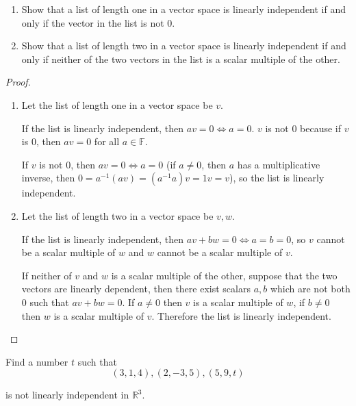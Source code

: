 \begin{exercise}
    \begin{enumerate}[label={(\alph*)}]
        \item Show that a list of length one in a vector space is linearly independent if and only if the vector in the list is not $0$.
        \item Show that a list of length two in a vector space is linearly independent if and only if neither of the two vectors in the list is a scalar multiple of the other.
    \end{enumerate}
\end{exercise}

\begin{proof}
    \begin{enumerate}[label={(\alph*)}]
        \item Let the list of length one in a vector space be $v$.

              If the list is linearly independent, then $av = 0\Longleftrightarrow a = 0$. $v$ is not $0$ because if $v$ is $0$, then $av = 0$ for all $a\in\mathbb{F}$.

              If $v$ is not $0$, then $av = 0\Longleftrightarrow a = 0$ (if $a\ne 0$, then $a$ has a multiplicative inverse, then $0 = a^{-1}(av) = (a^{-1}a)v = 1v = v$), so the list is linearly independent.
        \item Let the list of length two in a vector space be $v, w$.

              If the list is linearly independent, then $av + bw = 0\Longleftrightarrow a = b = 0$, so $v$ cannot be a scalar multiple of $w$ and $w$ cannot be a scalar multiple of $v$.

              If neither of $v$ and $w$ is a scalar multiple of the other, suppose that the two vectors are linearly dependent, then there exist scalars $a, b$ which are not both $0$ such that $av + bw = 0$. If $a\ne 0$ then $v$ is a scalar multiple of $w$, if $b\ne 0$ then $w$ is a scalar multiple of $v$. Therefore the list is linearly independent.
    \end{enumerate}
\end{proof}

\begin{exercise}
    Find a number $t$ such that
    \[
        (3, 1, 4), (2, -3, 5), (5, 9, t)
    \]

    is not linearly independent in $\mathbb{R}^{3}$.
\end{exercise}

